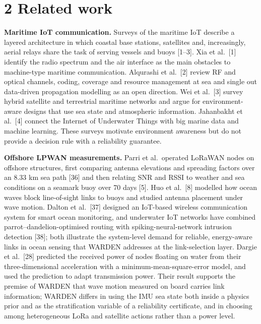 \documentclass[
  11pt,
]{article}
\begin{document}
\hypertarget{related-work}{%
\section{2 Related work}\label{related-work}}

\textbf{Maritime IoT communication.} Surveys of the maritime IoT
describe a layered architecture in which coastal base stations,
satellites and, increasingly, aerial relays share the task of serving
vessels and buoys {[}1--3{]}. Xia et al.~{[}1{]} identify the radio
spectrum and the air interface as the main obstacles to machine-type
maritime communication. Alqurashi et al.~{[}2{]} review RF and optical
channels, coding, coverage and resource management at sea and single out
data-driven propagation modelling as an open direction. Wei et
al.~{[}3{]} survey hybrid satellite and terrestrial maritime networks
and argue for environment-aware designs that use sea state and
atmospheric information. Jahanbakht et al.~{[}4{]} connect the Internet
of Underwater Things with big marine data and machine learning. These
surveys motivate environment awareness but do not provide a decision
rule with a reliability guarantee.

\textbf{Offshore LPWAN measurements.} Parri et al.~operated LoRaWAN
nodes on offshore structures, first comparing antenna elevations and
spreading factors over an 8.33 km sea path {[}36{]} and then relating
SNR and RSSI to weather and sea conditions on a seamark buoy over 70
days {[}5{]}. Huo et al.~{[}8{]} modelled how ocean waves block
line-of-sight links to buoys and studied antenna placement under wave
motion. Dalton et al.~{[}37{]} designed an IoT-based wireless
communication system for smart ocean monitoring, and underwater IoT
networks have combined parrot--dandelion-optimised routing with
spiking-neural-network intrusion detection {[}38{]}; both illustrate the
system-level demand for reliable, energy-aware links in ocean sensing
that WARDEN addresses at the link-selection layer. Dargie et
al.~{[}28{]} predicted the received power of nodes floating on water
from their three-dimensional acceleration with a
minimum-mean-square-error model, and used the prediction to adapt
transmission power. Their result supports the premise of WARDEN that
wave motion measured on board carries link information; WARDEN differs
in using the IMU sea state both inside a physics prior and as the
stratification variable of a reliability certificate, and in choosing
among heterogeneous LoRa and satellite actions rather than a power
level.
\end{document}

